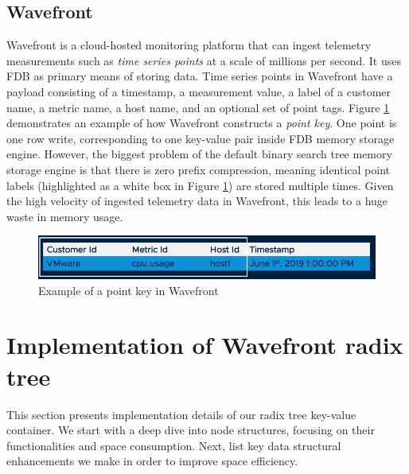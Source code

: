 \documentclass[sigplan,screen,nonacm]{acmart}
\begin{document}
\subsection{Wavefront}
Wavefront \cite{wavefront} is a cloud-hosted monitoring platform that can ingest telemetry measurements such as {\itshape time series points} at a scale of millions per second. It uses FDB as primary means of storing data. Time series points in Wavefront have a payload consisting of a timestamp, a measurement value, a label of a customer name, a metric name, a host name, and an optional set of point tags. Figure \ref{fig:point-key} demonstrates an example of how Wavefront constructs a {\itshape point key}. One point is one row write, corresponding to one key-value pair inside FDB memory storage engine. However, the biggest problem of the default binary search tree memory storage engine is that there is zero prefix compression, meaning identical point labels (highlighted as a white box in Figure \ref{fig:point-key}) are stored multiple times. Given the high velocity of ingested telemetry data in Wavefront, this leads to a huge waste in memory usage. 
\begin{figure}[h]
  \centering
  \includegraphics[width=\linewidth]{pic/point key.png}
  \setlength{\abovecaptionskip}{-10pt} 
  \setlength{\belowcaptionskip}{-7pt} 
  \caption{Example of a point key in Wavefront}
  \label{fig:point-key}
\end{figure}

\section{Implementation of Wavefront radix tree}
This section presents implementation details of our radix tree key-value container. We start with a deep dive into node structures, focusing on their functionalities and space consumption. Next, list key data structural enhancements we make in order to improve space efficiency.
\end{document}
